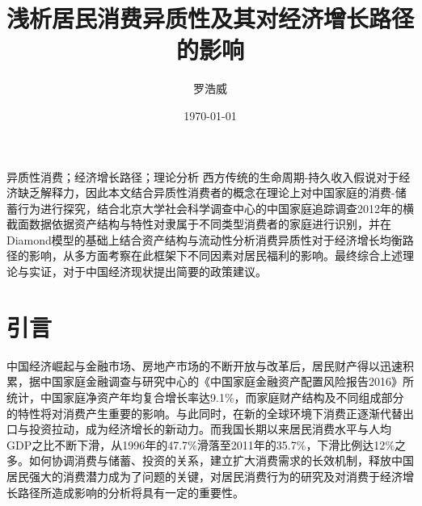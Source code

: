 \documentclass[supercite]{HustGraduPaper}
\title{浅析居民消费异质性及其对经济增长路径的影响}
\author{罗浩威}
\date{\today}
\begin{document}
    \maketitle
    \statement
    \clearpage 
    
    \begin{cnabstract}{异质性消费；经济增长路径；理论分析}
    西方传统的生命周期-持久收入假说对于经济缺乏解释力，因此本文结合异质性消费者的概念在理论上对中国家庭的消费-储蓄行为进行探究，结合北京大学社会科学调查中心的中国家庭追踪调查2012年的横截面数据依据资产结构与特性对隶属于不同类型消费者的家庭进行识别，并在Diamond模型的基础上结合资产结构与流动性分析消费异质性对于经济增长均衡路径的影响，从多方面考察在此框架下不同因素对居民福利的影响。最终综合上述理论与实证，对于中国经济现状提出简要的政策建议。
        
    \end{cnabstract}

    \tableofcontents
    \clearpage

    \section{引言}
    中国经济崛起与金融市场、房地产市场的不断开放与改革后，居民财产得以迅速积累，据中国家庭金融调查与研究中心的《中国家庭金融资产配置风险报告2016》所统计，中国家庭净资产年均复合增长率达9.1$\%$，而家庭财产结构及不同组成部分的特性将对消费产生重要的影响。与此同时，在新的全球环境下消费正逐渐代替出口与投资拉动，成为经济增长的新动力。而我国长期以来居民消费水平与人均GDP之比不断下滑，从1996年的47.7$\%$滑落至2011年的35.7$\%$，下滑比例达12$\%$之多。如何协调消费与储蓄、投资的关系，建立扩大消费需求的长效机制，释放中国居民强大的消费潜力成为了问题的关键，对居民消费行为的研究及对消费于经济增长路径所造成影响的分析将具有一定的重要性。
    
\end{document}
